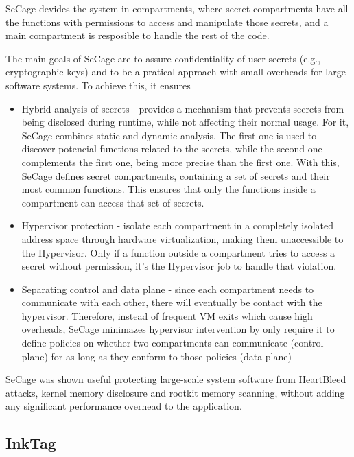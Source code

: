 SeCage devides the system in compartments, where secret compartments have all the functions with permissions to access and manipulate those secrets, and a main compartment is resposible to handle the rest of the code.

The main goals of SeCage are to assure confidentiality of user secrets (e.g., cryptographic keys) and to be a pratical approach with small overheads for large software systems. To achieve this, it ensures

\begin{itemize}
	\item Hybrid analysis of secrets - provides a mechanism that prevents secrets from being disclosed during runtime, while not affecting their normal usage. For it, SeCage combines static and dynamic analysis. The first one is used to discover potencial functions related to the secrets, while the second one complements the first one, being more precise than the first one. With this, SeCage defines secret compartments, containing a set of secrets and their most common functions. This ensures that only the functions inside a compartment can access that set of secrets.  
	\item Hypervisor protection - isolate each compartment in a completely isolated address space through hardware virtualization, making them unaccessible to the Hypervisor. Only if a function outside a compartment tries to access a secret without permission, it's the Hypervisor job to handle that violation.
	\item Separating control and data plane - since each compartment needs to communicate with each other, there will eventually be contact with the hypervisor. Therefore, instead of frequent VM exits which cause high overheads, SeCage minimazes hypervisor intervention by only require it to define policies on whether two compartments can communicate (control plane) for as long as they conform to those policies (data plane)
	
\end{itemize}

SeCage was shown useful protecting large-scale system software from HeartBleed attacks, kernel memory disclosure and rootkit memory scanning, without adding any significant performance overhead to the application.


\subsection{InkTag}

